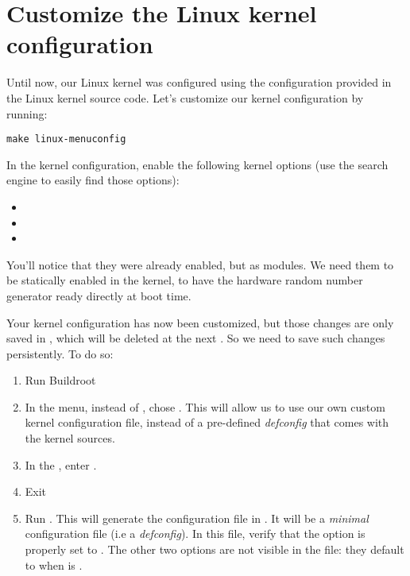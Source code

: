 \section{Customize the Linux kernel configuration}

Until now, our Linux kernel was configured using the
 configuration provided in the Linux kernel
source code. Let's customize our kernel configuration by running:

\begin{verbatim}
make linux-menuconfig
\end{verbatim}

In the kernel configuration, enable the following kernel options (use
the \code{/} search engine to easily find those options):

\begin{itemize}
\item {}
\item {}
\item {}
\end{itemize}

You'll notice that they were already enabled, but as modules. We need
them to be statically enabled in the kernel, to have the hardware
random number generator ready directly at boot time.

Your kernel configuration has now been customized, but those changes
are only saved in , which
will be deleted at the next . So we need to save such
changes persistently. To do so:

\begin{enumerate}

\item Run Buildroot 

\item In the  menu, instead of ,
  chose . This will allow us to use
  our own custom kernel configuration file, instead of a pre-defined
  {\em defconfig} that comes with the kernel sources.

\item In the , enter
  .

\item Exit 

\item Run . This will generate the
  configuration file in
  . It will be a {\em
    minimal} configuration file (i.e a {\em defconfig}). In this file,
  verify that the option is properly set to
  . The other two options are not visible in the
   file: they default to  when
   is .

\end{enumerate}

